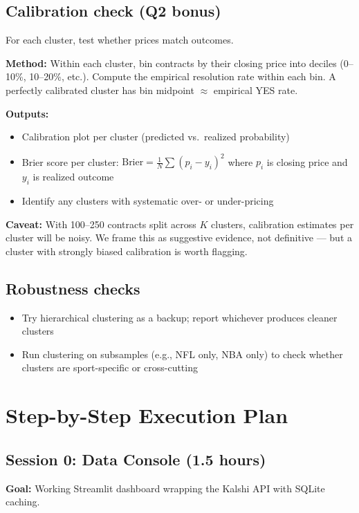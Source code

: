 \documentclass[11pt]{article}
\begin{document}
\subsection{Calibration check (Q2 bonus)}

For each cluster, test whether prices match outcomes.

\textbf{Method:} Within each cluster, bin contracts by their closing price into deciles (0--10\%, 10--20\%, etc.). Compute the empirical resolution rate within each bin. A perfectly calibrated cluster has bin midpoint $\approx$ empirical YES rate.

\textbf{Outputs:}
\begin{itemize}[leftmargin=*, itemsep=0pt]
    \item Calibration plot per cluster (predicted vs.\ realized probability)
    \item Brier score per cluster: $\text{Brier} = \frac{1}{N} \sum (p_i - y_i)^2$ where $p_i$ is closing price and $y_i$ is realized outcome
    \item Identify any clusters with systematic over- or under-pricing
\end{itemize}

\textbf{Caveat:} With 100--250 contracts split across $K$ clusters, calibration estimates per cluster will be noisy. We frame this as suggestive evidence, not definitive --- but a cluster with strongly biased calibration is worth flagging.

\subsection{Robustness checks}

\begin{itemize}[leftmargin=*, itemsep=0pt]
    \item Try hierarchical clustering as a backup; report whichever produces cleaner clusters
    \item Run clustering on subsamples (e.g., NFL only, NBA only) to check whether clusters are sport-specific or cross-cutting
\end{itemize}

\section{Step-by-Step Execution Plan}

\subsection*{Session 0: Data Console (1.5 hours)}
\textbf{Goal:} Working Streamlit dashboard wrapping the Kalshi API with SQLite caching.
\end{document}

